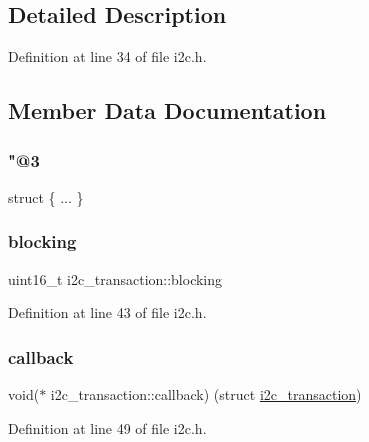 \subsection{Detailed Description}


Definition at line 34 of file i2c.\+h.



\subsection{Member Data Documentation}
\mbox{\label{structi2c__transaction_a35843fd5bb3d1472e87543491e4d55c0}} 
\subsubsection{\texorpdfstring{"@3}{@3}}
{\footnotesize\ttfamily struct \{ ... \} }

\mbox{\label{structi2c__transaction_a8194807e4e35ff63c815e8865e2b35a8}} 
\subsubsection{\texorpdfstring{blocking}{blocking}}
{\footnotesize\ttfamily uint16\+\_\+t i2c\+\_\+transaction\+::blocking}



Definition at line 43 of file i2c.\+h.

\mbox{\label{structi2c__transaction_aa5519941867a3e28ccb32fc9c5919bde}} 
\subsubsection{\texorpdfstring{callback}{callback}}
{\footnotesize\ttfamily void($\ast$ i2c\+\_\+transaction\+::callback) (struct \mbox{\hyperlink{structi2c__transaction}{i2c\+\_\+transaction}})}



Definition at line 49 of file i2c.\+h.

\mbox{\label{structi2c__transaction_a2528939b8dab26063413e929081aa990}} 

